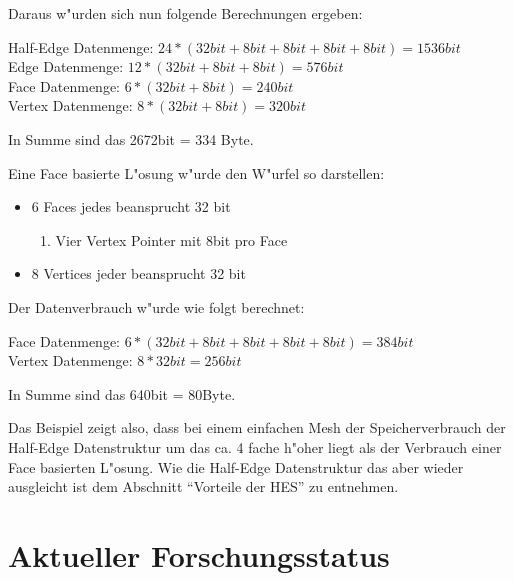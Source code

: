 \documentclass[pagesize, paper=a4, fontsize=12pt,titlepage=true, headings=small, headnosepline, abstractoff, liststotoc, nochapterprefix, plainheadsepline]{scrreprt}
\newcommand{\HES}{Half-Edge Datenstruktur }
\begin{document}
Daraus w"urden sich nun folgende Berechnungen ergeben:

	Half-Edge Datenmenge: \begin{math}24 * (32bit+ 8bit + 8bit + 8bit + 8bit) = 1536bit\end{math}
	\\
	Edge Datenmenge: \begin{math}12 * (32bit + 8bit + 8bit) = 576bit\end{math}
	\\
	Face Datenmenge: \begin{math}6 * (32bit + 8bit) = 240bit\end{math}
	\\
	Vertex Datenmenge: \begin{math}8 * (32bit + 8bit) = 320bit\end{math}

	In Summe sind das 2672bit = 334 Byte.
\newline

Eine Face basierte L"osung w"urde den W"urfel so darstellen:
\begin{itemize}
\item 6 Faces jedes beansprucht 32 bit
	\begin{enumerate}
    	\item Vier Vertex Pointer mit 8bit pro Face
	\end{enumerate}
\item 8 Vertices jeder beansprucht 32 bit
\end{itemize}

Der Datenverbrauch w"urde wie folgt berechnet:

	Face Datenmenge: \begin{math}6 * (32bit + 8bit + 8bit + 8bit + 8bit) = 384bit\end{math}
	\\
	Vertex Datenmenge: \begin{math}8 * 32bit = 256bit\end{math}

	In Summe sind das 640bit = 80Byte.
\newline

Das Beispiel zeigt also, dass bei einem einfachen Mesh der Speicherverbrauch der \HES um das ca. 4 fache h"oher liegt als der Verbrauch einer Face basierten L"osung. Wie die \HES das aber wieder ausgleicht ist dem Abschnitt "`Vorteile der HES"' zu entnehmen.
	\section {Aktueller Forschungsstatus}
\end{document}
